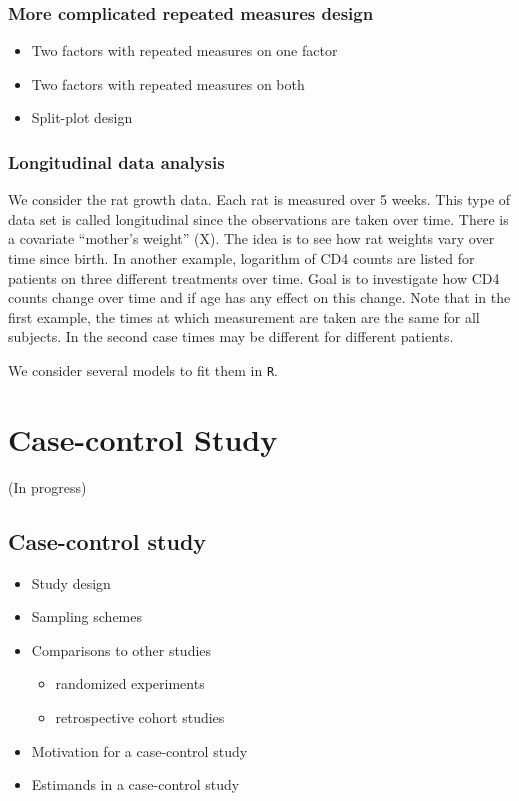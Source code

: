\documentclass[12pt,]{book}
\providecommand{\tightlist}{%
  \setlength{\itemsep}{0pt}\setlength{\parskip}{0pt}}
\begin{document}
\subsection{More complicated repeated measures
design}\label{more-complicated-repeated-measures-design}

\begin{itemize}
\tightlist
\item
  Two factors with repeated measures on one factor
\item
  Two factors with repeated measures on both
\item
  Split-plot design
\end{itemize}

\subsection{Longitudinal data
analysis}\label{longitudinal-data-analysis}

We consider the rat growth data. Each rat is measured over 5 weeks. This
type of data set is called longitudinal since the observations are taken
over time. There is a covariate ``mother's weight'' (X). The idea is to
see how rat weights vary over time since birth. In another example,
logarithm of CD4 counts are listed for patients on three different
treatments over time. Goal is to investigate how CD4 counts change over
time and if age has any effect on this change. Note that in the first
example, the times at which measurement are taken are the same for all
subjects. In the second case times may be different for different
patients.

We consider several models to fit them in \texttt{R}.

\chapter{Case-control Study}\label{ch:case}

(In progress)

\section{Case-control study}\label{case-control-study}

\begin{itemize}
\tightlist
\item
  Study design
\item
  Sampling schemes
\item
  Comparisons to other studies

  \begin{itemize}
  \tightlist
  \item
    randomized experiments
  \item
    retrospective cohort studies
  \end{itemize}
\item
  Motivation for a case-control study
\item
  Estimands in a case-control study
\end{itemize}
\end{document}
